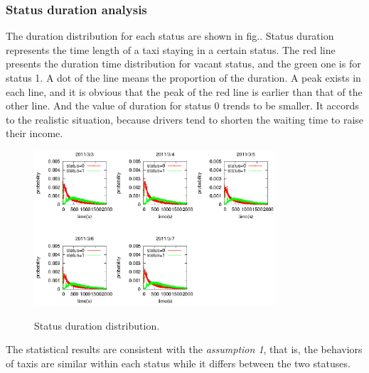 \subsubsection{Status duration analysis}
  The duration distribution for each status are shown in fig.\label{figure_duration_for_each_status}. Status duration represents the time length of a taxi staying in a certain status. The red line presents the duration time distribution for vacant status, and the green one is for status 1. A dot of the line means the proportion of the duration. A peak exists in each line, and it is obvious that the peak of the red line is earlier than that of the other line. And the value of duration for status 0 trends to be smaller. It accords to the realistic situation, because drivers tend to shorten the waiting time to raise their income.
\begin{figure}[!h]
\centering
\includegraphics[width=0.8\textwidth]{figures_201103/LastingTime_event.eps}\\
\caption{Status duration distribution.}\label{figure_duration_for_each_status}
\end{figure}

The statistical results are consistent with the \emph{assumption 1}, that is, the behaviors of taxis are similar within each status while it differs between the two statuses.
